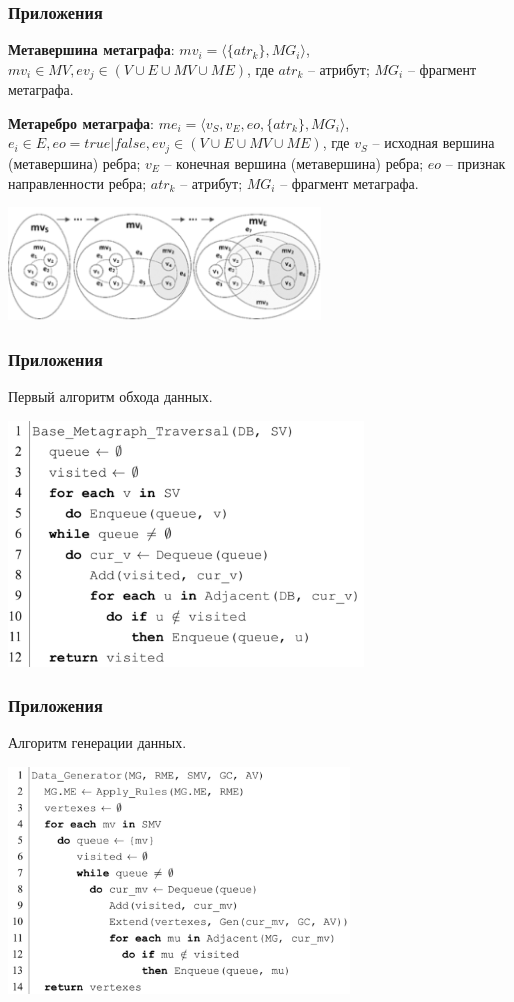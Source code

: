 \documentclass[pdf, hyperref={unicode}, aspectratio=169]{beamer}
\begin{document}
\begin{frame}
\frametitle{Приложения}
	\textbf{Метавершина метаграфа}: $mv_i = \langle \{ atr_k \}, MG_i \rangle$, $mv_i \in MV, ev_j \in (V \cup E \cup MV \cup ME)$, где $atr_k$ -- атрибут; $MG_i$ -- фрагмент метаграфа.

	\textbf{Метаребро метаграфа}: $me_i = \langle v_S, v_E, eo, \{ atr_k \}, MG_i \rangle$, $e_i \in E, eo = true | false, ev_j \in (V \cup E \cup MV \cup ME)$, где $v_S$ -- исходная вершина (метавершина) ребра; $v_E$ -- конечная вершина (метавершина) ребра; $eo$ -- признак направленности ребра; $atr_k$ -- атрибут; $MG_i$ -- фрагмент метаграфа.

	\begin{center}
		\includegraphics[height = 3cm]{img/metaedge}
	\end{center}
\end{frame}


\begin{frame}
\frametitle{Приложения}
	Первый алгоритм обхода данных.

	\begin{center}
		\includegraphics[height = 6.5cm]{img/algorithm-base}
	\end{center}
\end{frame}


\begin{frame}
\frametitle{Приложения}
	Алгоритм генерации данных.

	\begin{center}
		\includegraphics[height = 6cm]{img/extra-alg-generator}
	\end{center}
\end{frame}
\end{document}
